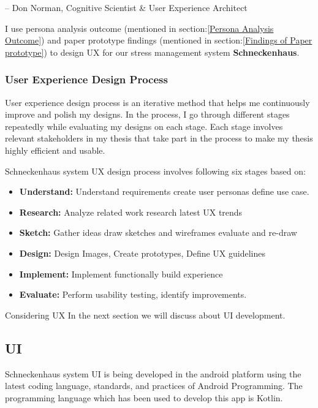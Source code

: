– Don Norman, Cognitive Scientist \& User Experience Architect \citep{Norman1988TheThings}

I use persona analysis outcome (mentioned in section:\ref{Persona Analysis Outcome}) and paper prototype findings (mentioned in section:\ref{Findings of Paper prototype}) to design \acf{UX}  for our stress management system \textbf{Schneckenhaus}. 

\subsubsection*{User Experience Design Process}
User experience design process is an iterative method that helps me continuously improve and polish my designs. In the process, I go through different stages repeatedly while evaluating my designs on each stage. Each stage involves relevant stakeholders in my thesis that take part in the process to make my thesis highly efficient and usable.

Schneckenhaus system UX design process involves following six stages based on: \citep{Minhas2018UserPlanet}

\begin{itemize}
    \item \textbf{Understand:} Understand requirements create user personas define use case.
    \item \textbf{Research:} Analyze related work research latest UX trends
    \item \textbf{Sketch:} Gather ideas draw sketches and wireframes evaluate and re-draw
    \item \textbf{Design:} Design Images, Create prototypes, Define UX guidelines
    \item \textbf{Implement:} Implement functionally build experience
    \item \textbf{Evaluate:} Perform usability testing, identify improvements.
\end{itemize}

Considering \acf{UX} In the next section we will discuss about \acf{UI} development.

\subsection*{\acf{UI}}
Schneckenhaus system UI is being developed in the android platform using the latest coding language, standards, and practices of Android Programming. The programming language which has been used to develop this app is Kotlin. 

